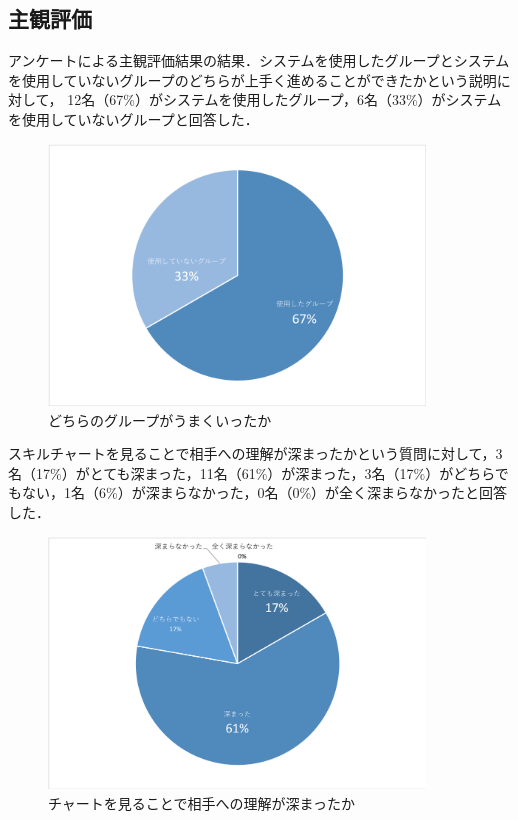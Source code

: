 \documentclass{funthesis}
\begin{document}
\subsection{主観評価}
アンケートによる主観評価結果の結果．システムを使用したグループとシステムを使用していないグループのどちらが上手く進めることができたかという説明に対して，
12名（67\%）がシステムを使用したグループ，6名（33\%）がシステムを使用していないグループと回答した．
\begin{figure}[H]
 \centering
   \includegraphics[width=100mm]{honhon0.png}
 \caption{どちらのグループがうまくいったか}
 \label{testtest}
\end{figure}

スキルチャートを見ることで相手への理解が深まったかという質問に対して，3名（17\%）がとても深まった，11名（61\%）が深まった，3名（17\%）がどちらでもない，1名（6\%）が深まらなかった，0名（0\%）が全く深まらなかったと回答した．
\begin{figure}[H]
 \centering
   \includegraphics[width=100mm]{honban2.png}
 \caption{チャートを見ることで相手への理解が深まったか}
 \label{testtest}
\end{figure}
\end{document}
